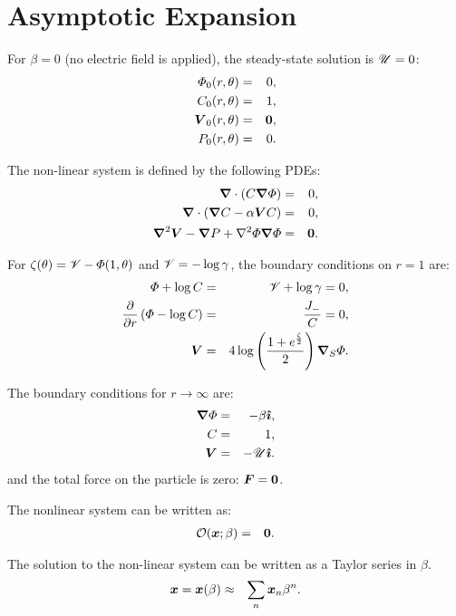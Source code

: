 \section{Asymptotic Expansion}

For $\beta = 0$ (no electric field is applied), the steady-state solution is $\mathscr{U} = 0$:
\begin{eqnarray}
\varPhi_0(r,\theta) &=& 0, \\
C_0(r,\theta) &=& 1, \\
\boldsymbol{V}_0(r,\theta) &=& \boldsymbol{0}, \\
P_0(r,\theta) &=& 0.
\end{eqnarray}

The non-linear system is defined by the following PDEs:
\label{PDEs}
\begin{eqnarray}
\boldsymbol{\nabla} \cdot \left(C \boldsymbol{\nabla} \varPhi\right) &=& 0, \\
\boldsymbol{\nabla} \cdot \left(\boldsymbol{\nabla} C - \alpha \boldsymbol{V} C\right) &=& 0, \\
\boldsymbol{\nabla}^2 \boldsymbol{V} - \boldsymbol{\nabla} P + \nabla^2 \varPhi \boldsymbol{\nabla} \varPhi &=& \boldsymbol{0}.
\end{eqnarray}

For $\zeta(\theta) = \mathscr{V} - \varPhi(1, \theta)$ and 
$\mathscr{V} = -\log \gamma$, the boundary conditions on $r = 1$ are:
\begin{eqnarray}
\varPhi + \log C &=& \mathscr{V} + \log \gamma = 0, \\
\frac{\partial }{\partial r}\left(\varPhi - \log C\right) &=& \frac{J_-}{C} = 0, \\
\boldsymbol{V} &=& 4\log\left(\frac{1 + e^\frac{\zeta}{2}}{2}\right) \boldsymbol{\nabla}_S \varPhi.
\end{eqnarray}

The boundary conditions for $r \rightarrow \infty$ are:
\begin{eqnarray}
\boldsymbol{\nabla} \varPhi &=& -\beta \boldsymbol{\hat{\imath}}, \\
C &=& 1, \\
\boldsymbol{V} &=& -\mathscr{U} \boldsymbol{\hat{\imath}}.
\end{eqnarray}
and the total force on the particle is zero: $\boldsymbol{F} = \boldsymbol{0}$.

The nonlinear system can be written as: 
\begin{eqnarray}
\mathcal{O}(\boldsymbol{x};\beta) &=& \boldsymbol{0}.
\end{eqnarray}

The solution to the non-linear system can be written as a Taylor series in $\beta$.
\begin{eqnarray}
\boldsymbol{x} = \boldsymbol{x}(\beta) &\approx& \sum_n \boldsymbol{x}_n \beta^n.
\end{eqnarray}

